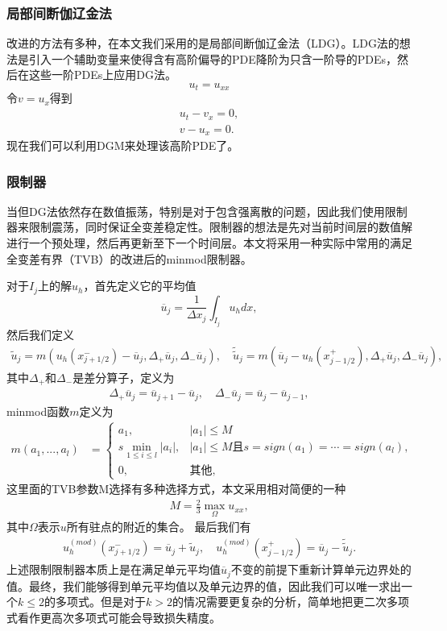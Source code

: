 \subsubsection{局部间断伽辽金法}
改进的方法有多种，在本文我们采用的是局部间断伽辽金法（LDG）。LDG法的想法是引入一个辅助变量来使得含有高阶偏导的PDE降阶为只含一阶导的PDEs，然后在这些一阶PDEs上应用DG法。
\begin{equation}
    u_t = u_{xx}
\end{equation}
令$v = u_x$得到
\begin{align}
    u_t - v_x = 0, \\
    v - u_x = 0.
\end{align}
现在我们可以利用DGM来处理该高阶PDE了。
\subsubsection{限制器}
当但DG法依然存在数值振荡，特别是对于包含强离散的问题，因此我们使用限制器来限制震荡，同时保证全变差稳定性。限制器的想法是先对当前时间层的数值解进行一个预处理，然后再更新至下一个时间层。本文将采用一种实际中常用的满足全变差有界（TVB）的改进后的minmod限制器\cite{cockburn1989tvb2}。

对于$I_j$上的解$u_h$，首先定义它的平均值
$$
    \overline{u}_j = \frac{1}{\Delta x_j}\int_{I_j}u_h dx,
$$
然后我们定义
\begin{align}
    \tilde{u}_j = m(u_h(x^-_{j+1/2})-\overline{u}_j, \Delta_+\overline{u}_j, \Delta_-\overline{u}_j), \quad \tilde{\tilde{u}}_j = m(\overline{u}_j-u_h(x^+_{j-1/2}), \Delta_+\overline{u}_j, \Delta_-\overline{u}_j),
\end{align}
其中$\Delta_+$和$\Delta_-$是差分算子，定义为
\begin{align}
    \Delta_+\overline{u}_j = \overline{u}_{j+1}-\overline{u}_{j}, \quad \Delta_-\overline{u}_j = \overline{u}_{j}-\overline{u}_{j-1},
\end{align}
minmod函数$m$定义为
\begin{align}
    m(a_1, ..., a_l) & =
    \begin{cases}
        a_1,                         & |a_1| \leq M                                              \\
        s \min_{1\leq i\leq l}|a_i|, & |a_1| \leq M \text{且}s = sign(a_1) = \cdots = sign(a_l), \\
        0 ,                          & \text{其他},
    \end{cases}
\end{align}
这里面的TVB参数M选择有多种选择方式，本文采用相对简便的一种\cite{cockburn1989tvb3}
\begin{align}
    M = \frac{2}{3}\max_{\Omega}u_{xx},
\end{align}
其中$\Omega$表示$u$所有驻点的附近的集合。
最后我们有
\begin{align}
    u^{(mod)}_h(x^-_{j+1/2}) = \overline{u}_j + \tilde{u}_j, \quad u^{(mod)}_h(x^+_{j-1/2}) = \overline{u}_j - \tilde{\tilde{u}}_j.
\end{align}
上述限制限制器本质上是在满足单元平均值$\overline{u}_j$不变的前提下重新计算单元边界处的值。最终，我们能够得到单元平均值以及单元边界的值，因此我们可以唯一求出一个$k\leq 2$的多项式。但是对于$k> 2$的情况需要更复杂的分析，简单地把更二次多项式看作更高次多项式可能会导致损失精度。
